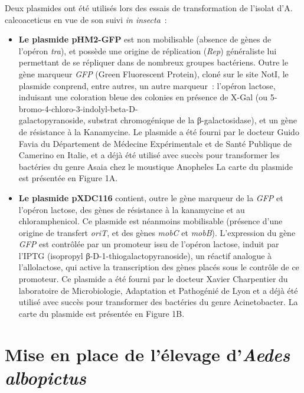 Deux plasmides ont été utilisés lors des essais de transformation de l'isolat d'A. calcoaceticus en vue de son suivi \textit{in insecta}~:
\begin{itemize}
\item \textbf{Le plasmide pHM2-GFP} est non mobilisable (absence de gènes de l'opéron \textit{tra}), et possède une origine de réplication (\textit{Rep}) généraliste lui permettant de se répliquer dans de nombreux groupes bactériens.
Outre le gène marqueur \textit{GFP} (Green Fluorescent Protein), cloné sur le site NotI, le plasmide conprend, entre autres, un autre marqueur~: l'opéron lactose, induisant une coloration bleue des colonies en présence de X-Gal (ou 5-bromo-4-chloro-3-indolyl-beta-D-\\galactopyranoside, substrat chromogénique de la β-galactosidase), et un gène de résistance à la Kanamycine.
Le plasmide a été fourni par le docteur Guido Favia du Département de Médecine Expérimentale et de Santé Publique de Camerino en Italie, et a déjà été utilisé avec succès pour transformer les bactéries du genre Asaia chez le moustique Anopheles \cite{favia2007}
La carte du plasmide est présentée en Figure 1A.

\item \textbf{Le plasmide pXDC116} contient, outre le gène marqueur de la \textit{GFP} et l'opéron lactose, des gènes de résistance à la kanamycine et au chloramphenicol. Ce plasmide est néanmoins mobilisable (présence d'une origine de transfert \textit{oriT}, et des gènes \textit{mobC} et \textit{mobB}).
L'expression du gène \textit{GFP} est contrôlée par un promoteur issu de l'opéron lactose, induit par l'IPTG (isopropyl β-D-1-thiogalactopyranoside), un réactif analogue à l'allolactose, qui active la transcription des gènes placés sous le contrôle de ce promoteur.
Ce plasmide a été fourni par le docteur Xavier Charpentier du laboratoire de Microbiologie, Adaptation et Pathogénié de Lyon et a déjà été utilisé avec succès pour transformer des bactéries du genre Acinetobacter. La carte du plasmide est présentée en Figure 1B.

\end{itemize}


\section{Mise en place de l'élevage d'\textit{Aedes albopictus}}

